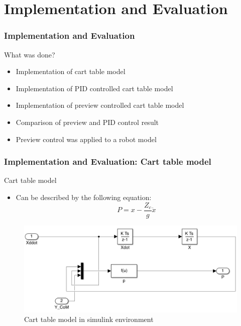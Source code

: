 \documentclass{beamer}
\begin{document}
	\section*{Implementation and Evaluation}
	\begin{frame}
		\frametitle{Implementation and Evaluation}
		\begin{block}{What was done?}
			\begin{itemize}
				\item
					Implementation of cart table model
				\item
					Implementation of PID controlled cart table model
				\item
					Implementation of preview controlled cart table model
				\item
					Comparison of preview and PID control result
				\item
					Preview control was applied to a robot model
			\end{itemize}
		\end{block}
	\end{frame}


\begin{frame}
	\frametitle{Implementation and Evaluation: Cart table model}
	\begin{block}{Cart table model}
		\begin{itemize}
			\item
				Can be described by the following equation:
				\begin{equation}
						P = x - \dfrac{Z_c}{g} \ddot{x}
				\end{equation}
		\end{itemize}
	\end{block}
	
	\begin{figure}[h!]
		\centering
		\includegraphics[width=0.8\linewidth]{presentation_images/18}
		\caption{Cart table model in simulink environment}
	\end{figure}
\end{frame}
\end{document}
